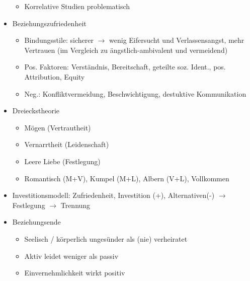 \documentclass[11pt, paper=a4, twocolumn]{scrartcl}
\begin{document}
\begin{itemize}
\begin{itemize}
					\item Korrelative Studien problematisch
				\end{itemize}
			\item Beziehungszufriedenheit
				\begin{itemize}
					\item Bindungsstile: sicherer $\rightarrow$ wenig Eifersucht und Verlassensangst, mehr Vertrauen (im Vergleich 
						zu ängstlich-ambivalent und vermeidend)
					\item Pos. Faktoren: Verständnis, Bereitschaft, geteilte soz. Ident., pos. Attribution, Equity
					\item Neg.: Konfliktvermeidung, Beschwichtigung, destuktive Kommunikation
				\end{itemize}
			\item Dreieckstheorie
				\begin{itemize}
					\item Mögen (Vertrautheit)
					\item Vernarrtheit (Leidenschaft)
					\item Leere Liebe (Festlegung)
					\item Romantisch (M+V), Kumpel (M+L), Albern (V+L), Vollkommen
				\end{itemize}
			\item Investitionsmodell: Zufriedenheit, Investition (+), Alternativen(-) $\rightarrow$ Festlegung $\rightarrow$ Trennung
			\item Beziehungsende
				\begin{itemize}
					\item Seelisch / körperlich ungesünder als (nie) verheiratet
					\item Aktiv leidet weniger als passiv
					\item Einvernehmlichkeit wirkt positiv
				\end{itemize}
		\end{itemize}
\end{document}
